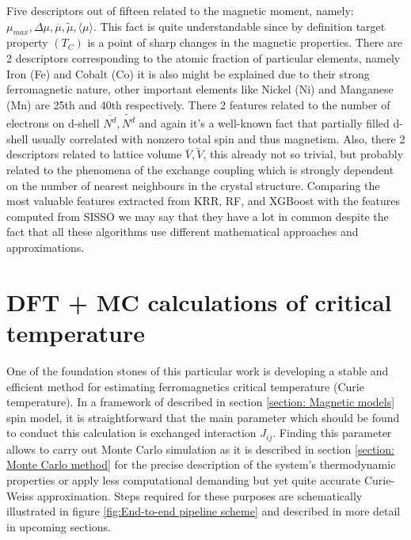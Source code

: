 Five descriptors out of fifteen related to the magnetic moment, namely: $\mu_{max}, \Delta \mu,  \overline{\mu}, \tilde{\mu}, \langle \mu \rangle$. This fact is quite understandable since by definition target property $(T_C)$ is a point of sharp changes in the magnetic properties.
There are 2 descriptors corresponding to the atomic fraction of particular elements, namely Iron (Fe) and Cobalt (Co) it is also might be explained due to their strong ferromagnetic nature, other important elements like Nickel (Ni) and Manganese (Mn) are 25th and 40th respectively.
There 2 features related to the number of electrons on d-shell $\overline{N^d}, \widetilde{N^d}$ and again it’s a well-known fact that partially filled d-shell usually correlated with nonzero total spin and thus magnetism.
Also, there 2 descriptors related to lattice volume $\overline{V}, \widetilde{V}$, this already not so trivial, but probably related to the phenomena of the exchange coupling which is strongly dependent on the number of nearest neighbours in the crystal structure.
Comparing the most valuable features extracted from KRR, RF, and XGBoost with the features computed from SISSO we may say that they have a lot in common despite the fact that all these algorithms use different mathematical approaches and approximations.




\cleardoublepage
\section{DFT + MC calculations of critical temperature}

\label{section: DFT_MC}

One of the foundation stones of this particular work is developing a stable and efficient method for estimating ferromagnetics critical temperature (Curie temperature). In a framework of described in section \ref{section: Magnetic models} spin model, it is straightforward that the main parameter which should be found to conduct this calculation is exchanged interaction $J_{ij}$. Finding this parameter allows to carry out Monte Carlo simulation as it is described in section \ref{section: Monte Carlo method}  for the precise description of the system's thermodynamic properties or apply less computational demanding but yet quite accurate Curie-Weiss approximation.  Steps required for these purposes are schematically illustrated in figure \ref{fig:End-to-end pipeline scheme} and described in more detail in upcoming sections.


